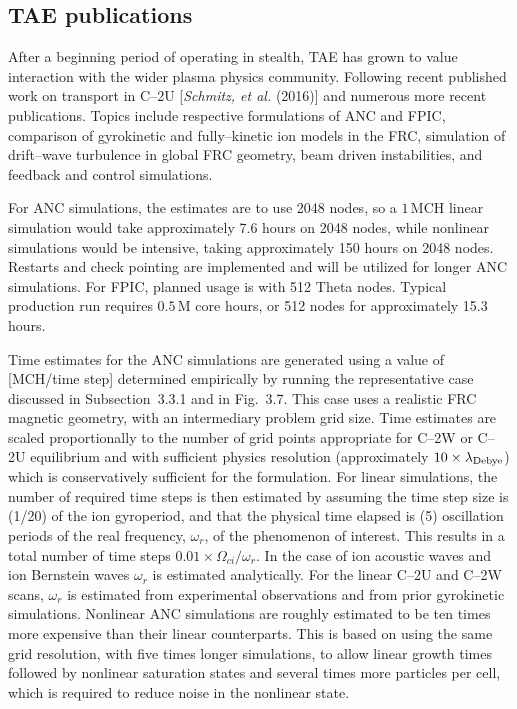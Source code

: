 \documentclass[a4paper,openany,12pt]{book}
\begin{document}
\subsection{TAE publications}

After a beginning period of operating in stealth, TAE has grown to value interaction with the wider plasma physics community. Following recent published work on transport in C--2U [\emph{Schmitz, et al.} (2016)] and numerous more recent publications. Topics include respective formulations of ANC and FPIC, comparison of gyrokinetic and fully--kinetic ion models in the FRC, simulation of drift--wave turbulence in global FRC geometry, beam driven instabilities, and feedback and control simulations.

For ANC simulations, the estimates are to use 2048 nodes, so a $1\,$MCH linear simulation would take approximately 7.6 hours on 2048 nodes, while nonlinear simulations would be intensive, taking approximately 150 hours on 2048 nodes. Restarts and check pointing are implemented and will be utilized for longer ANC simulations. For FPIC, planned usage is with 512 Theta nodes. Typical production run requires $0.5\,$M core hours, or 512 nodes for approximately 15.3 hours.

Time estimates for the ANC simulations are generated using a value of [MCH/time step] determined empirically by running the representative case discussed in Subsection~3.3.1 and in Fig.~3.7. This case uses a realistic FRC magnetic geometry, with an intermediary problem grid size. Time estimates are scaled proportionally to the number of grid points appropriate for C--2W  or C--2U equilibrium and with sufficient physics resolution (approximately $10\times\lambda_{\rm Debye}$) which is conservatively sufficient for the formulation. For linear simulations, the number of required time steps is then estimated by assuming the time step size is (1/20) of the ion gyroperiod, and that the physical time elapsed is (5) oscillation periods of the real frequency, $\omega_r$, of the phenomenon of interest. This results in a total number of time steps $0.01\times\Omega_{ci}/\omega_r$. In the case of ion acoustic waves and ion Bernstein waves $\omega_r$ is estimated analytically. For the linear C--2U and C--2W scans, $\omega_r$ is estimated from experimental observations and from prior gyrokinetic simulations. Nonlinear ANC simulations are roughly estimated to be ten times more expensive than their linear counterparts. This is based on using the same grid resolution, with five times longer simulations, to allow linear growth times followed by nonlinear saturation states and several times more particles per cell, which is required to reduce noise in the nonlinear state.
\end{document}
